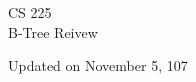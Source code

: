 \documentclass[11pt, letterpaper]{article}
\theoremstyle{definition}
\theoremstyle{theorem}
\begin{document}
  \begin{titlepage}
    {\LARGE CS 225} \\ 
    {\large B-Tree Reivew}
    \begin{multicols}{3}
      \tableofcontents
    \end{multicols}
    \vfill 
    Updated on November 5, 107
  \end{titlepage}
  
  \begin{multicols}{3}
    
    
    
  \end{multicols}
\end{document}
